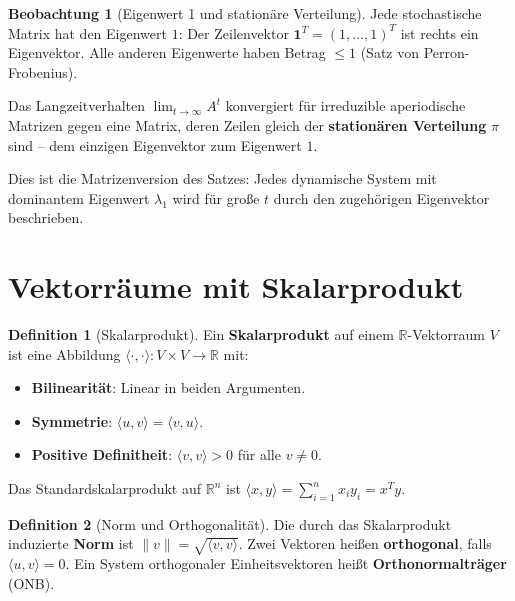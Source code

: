 ﻿\documentclass[a4paper,12pt]{report}
\theoremstyle{definition}
\newtheorem{definition}{Definition}
\newtheorem{beobachtung}{Beobachtung}
\begin{document}
\begin{beobachtung}[Eigenwert 1 und stationäre Verteilung]
    Jede stochastische Matrix hat den Eigenwert $1$: Der Zeilenvektor
    $\mathbf{1}^T = (1, \dots, 1)^T$ ist rechts ein Eigenvektor. Alle
    anderen Eigenwerte haben Betrag $\le 1$ (Satz von Perron-Frobenius).

    Das Langzeitverhalten $\lim_{t \to \infty} A^t$ konvergiert für
    irreduzible aperiodische Matrizen gegen eine Matrix, deren Zeilen
    gleich der \textbf{stationären Verteilung} $\pi$ sind -- dem
    einzigen Eigenvektor zum Eigenwert $1$.

    Dies ist die Matrizenversion des Satzes: Jedes dynamische System
    mit dominantem Eigenwert $\lambda_1$ wird für große $t$ durch den
    zugehörigen Eigenvektor beschrieben.
\end{beobachtung}

\section{Vektorräume mit Skalarprodukt}

\begin{definition}[Skalarprodukt]
    Ein \textbf{Skalarprodukt} auf einem $\mathbb{R}$-Vektorraum $V$ ist eine
    Abbildung $\langle \cdot, \cdot \rangle : V \times V \to \mathbb{R}$ mit:
    \begin{itemize}
        \item[-] \textbf{Bilinearität}: Linear in beiden Argumenten.
        \item[-] \textbf{Symmetrie}: $\langle u, v \rangle = \langle v, u \rangle$.
        \item[-] \textbf{Positive Definitheit}: $\langle v, v \rangle > 0$
              für alle $v \neq 0$.
    \end{itemize}
    Das Standardskalarprodukt auf $\mathbb{R}^n$ ist
    $\langle x, y \rangle = \sum_{i=1}^n x_i y_i = x^T y$.
\end{definition}

\begin{definition}[Norm und Orthogonalität]
    Die durch das Skalarprodukt induzierte \textbf{Norm} ist
    $\|v\| = \sqrt{\langle v, v \rangle}$. Zwei Vektoren heißen
    \textbf{orthogonal}, falls $\langle u, v \rangle = 0$.
    Ein System orthogonaler Einheitsvektoren heißt \textbf{Orthonormalträger} (ONB).
\end{definition}
\end{document}
